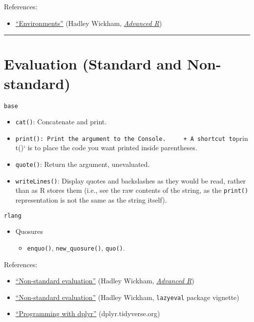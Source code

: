 \documentclass[
]{book}
\providecommand{\tightlist}{%
  \setlength{\itemsep}{0pt}\setlength{\parskip}{0pt}}
\begin{document}
References:

\begin{itemize}
\tightlist
\item
  \href{http://adv-r.had.co.nz/Environments.html\#environments}{``Environments''} (Hadley Wickham, \href{http://adv-r.had.co.nz/}{\emph{Advanced R}})
\end{itemize}

\begin{center}\rule{0.5\linewidth}{0.5pt}\end{center}

\hypertarget{evaluation-standard-and-non-standard}{%
\section{Evaluation (Standard and Non-standard)}\label{evaluation-standard-and-non-standard}}

\texttt{base}

\begin{itemize}
\tightlist
\item
  \texttt{cat()}: Concatenate and print.
\item
  \texttt{print():\ Print\ the\ argument\ to\ the\ Console.\ \ \ \ \ +\ A\ shortcut\ to}print()` is to place the code you want printed inside parentheses.
\item
  \texttt{quote()}: Return the argument, unevaluated.
\item
  \texttt{writeLines()}: Display quotes and backslashes as they would be read, rather than as R stores them (i.e., see the raw contents of the string, as the \texttt{print()} representation is not the same as the string itself).
\end{itemize}

\texttt{rlang}

\begin{itemize}
\tightlist
\item
  Quosures

  \begin{itemize}
  \tightlist
  \item
    \texttt{enquo()}, \texttt{new\_quosure()}, \texttt{quo()}.
  \end{itemize}
\end{itemize}

References:

\begin{itemize}
\tightlist
\item
  \href{http://adv-r.had.co.nz/Computing-on-the-language.html}{``Non-standard evaluation''} (Hadley Wickham, \href{http://adv-r.had.co.nz/}{\emph{Advanced R}})
\item
  \href{https://cran.r-project.org/web/packages/lazyeval/vignettes/lazyeval.html}{``Non-standard evaluation''} (Hadley Wickham, \texttt{lazyeval} package vignette)
\item
  \href{https://dplyr.tidyverse.org/articles/programming.html}{``Programming with dplyr''} (dplyr.tidyverse.org)
\end{itemize}
\end{document}
